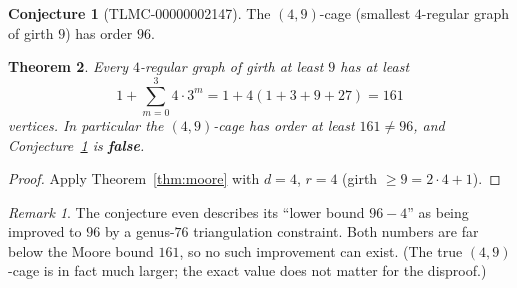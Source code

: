 \documentclass[11pt]{article}
\newtheorem{theorem}{Theorem}
\theoremstyle{definition}
\theoremstyle{remark}
\newtheorem*{remark}{Remark}
\theoremstyle{definition}
\newtheorem{conjecture}[theorem]{Conjecture}
\begin{document}
\begin{conjecture}[TLMC-00000002147]\label{conj:2147}
The $(4,9)$-cage (smallest $4$-regular graph of girth $9$) has order $96$.
\end{conjecture}

\begin{theorem}\label{thm:2147}
Every $4$-regular graph of girth at least $9$ has at least
\[
1 + \sum_{m=0}^{3} 4 \cdot 3^m = 1 + 4(1 + 3 + 9 + 27) = 161
\]
vertices. In particular the $(4,9)$-cage has order at least $161 \ne 96$, and Conjecture~\ref{conj:2147} is \textbf{false}.
\end{theorem}

\begin{proof}
Apply Theorem~\ref{thm:moore} with $d = 4$, $r = 4$ (girth $\ge 9 = 2\cdot 4 + 1$).
\end{proof}

\begin{remark}
The conjecture even describes its ``lower bound $96 - 4$'' as being improved to $96$ by a genus-$76$ triangulation constraint. Both numbers are far below the Moore bound $161$, so no such improvement can exist. (The true $(4,9)$-cage is in fact much larger; the exact value does not matter for the disproof.)
\end{remark}
\end{document}
